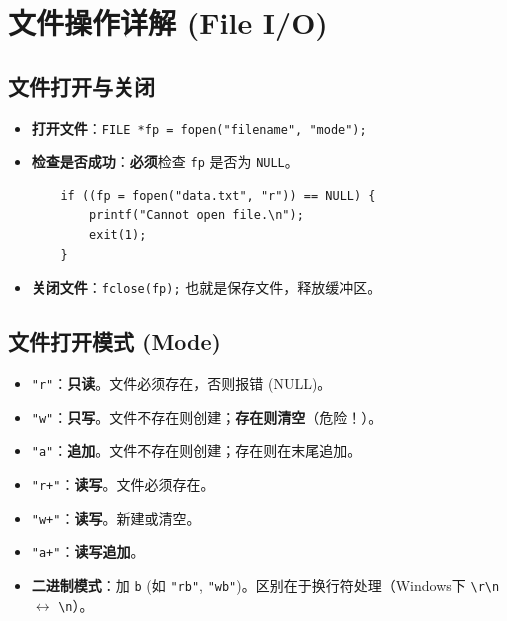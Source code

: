 \documentclass[a4paper,12pt]{article}
\begin{document}
\section{文件操作详解 (File I/O)}

\subsection{文件打开与关闭}
\begin{itemize}
    \item \textbf{打开文件}：\texttt{FILE *fp = fopen("filename", "mode");}
    \item \textbf{检查是否成功}：\textbf{必须}检查 \texttt{fp} 是否为 \texttt{NULL}。
    \begin{lstlisting}
    if ((fp = fopen("data.txt", "r")) == NULL) {
        printf("Cannot open file.\n");
        exit(1);
    }
    \end{lstlisting}
    \item \textbf{关闭文件}：\texttt{fclose(fp);} 也就是保存文件，释放缓冲区。
\end{itemize}

\subsection{文件打开模式 (Mode)}
\begin{itemize}
    \item \texttt{"r"}：\textbf{只读}。文件必须存在，否则报错 (NULL)。
    \item \texttt{"w"}：\textbf{只写}。文件不存在则创建；\textbf{存在则清空}（危险！）。
    \item \texttt{"a"}：\textbf{追加}。文件不存在则创建；存在则在末尾追加。
    \item \texttt{"r+"}：\textbf{读写}。文件必须存在。
    \item \texttt{"w+"}：\textbf{读写}。新建或清空。
    \item \texttt{"a+"}：\textbf{读写追加}。
    \item \textbf{二进制模式}：加 \texttt{b} (如 \texttt{"rb"}, \texttt{"wb"})。区别在于换行符处理（Windows下 \texttt{\textbackslash r\textbackslash n} $\leftrightarrow$ \texttt{\textbackslash n}）。
\end{itemize}
\end{document}
